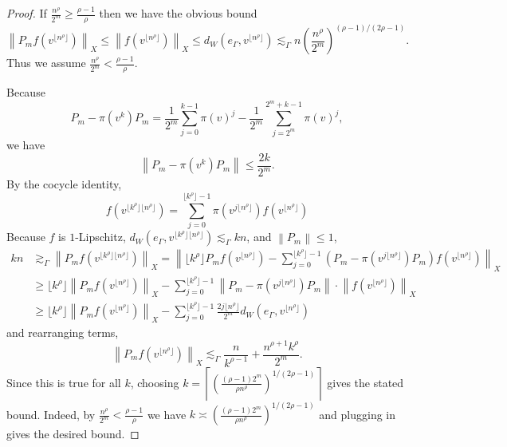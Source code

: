 \documentclass[11pt,reqno]{amsart}
\newcommand{\1}{\mathbf 1}
\begin{document}
\begin{proof}
If $\frac{n^\rho}{2^m}\ge \frac{\rho-1}\rho$ then we have the obvious bound
\[
\left\|P_m f\left(v^{\lfloor n^\rho\rfloor}\right)\right\|_X\le \left\| f\left(v^{\lfloor n^\rho\rfloor}\right)\right\|_X\le d_W\left(e_\Gamma,v^{\lfloor n^\rho\rfloor}\right)\lesssim_\Gamma n\left(\frac{n^\rho}{2^m}\right)^{\left(\rho-1\right)/\left(2\rho-1\right)}.
\]
Thus we assume $\frac{n^\rho}{2^m}< \frac{\rho-1}\rho$.

Because
\[
P_m-\pi\left(v^k\right)P_m= \frac{1}{2^m}\sum_{j=0}^{k-1}\pi\left(v\right)^j-\frac{1}{2^m}\sum_{j=2^m}^{2^m+k-1}\pi\left(v\right)^j,
\]
we have
\[
\left\|P_m-\pi\left(v^k\right)P_m\right\|\le \frac{2k}{2^m}.
\]
By the cocycle identity,
\[
f\left(v^{\lfloor k^\rho\rfloor \lfloor n^\rho\rfloor}\right)=\sum_{j=0}^{\lfloor k^\rho\rfloor -1} \pi\left(v^{j\lfloor n^\rho\rfloor }\right)f\left(v^{\lfloor n^\rho\rfloor}\right)
\]
Because $f$ is $1$-Lipschitz, $d_W\left(e_\Gamma,v^{\lfloor k^\rho\rfloor \lfloor n^\rho\rfloor}\right)\lesssim_\Gamma kn$, and $\left\|P_m\right\|\le 1$,
\begin{align*}
kn&\gtrsim_\Gamma \left\|P_mf \left(v^{\lfloor k^\rho\rfloor \lfloor n^\rho\rfloor}\right)\right\|_X=\left\|\lfloor k^\rho\rfloor P_mf\left(v^{\lfloor n^\rho\rfloor}\right) -\sum_{j=0}^{\lfloor k^\rho\rfloor -1} \left(P_m-\pi\left(v^{j\lfloor n^\rho\rfloor }\right)P_m\right)f\left(v^{\lfloor n^\rho\rfloor}\right)\right\|_X\\
&\ge \lfloor k^\rho\rfloor\left\| P_mf\left(v^{\lfloor n^\rho\rfloor}\right)\right\|_X -\sum_{j=0}^{\lfloor k^\rho\rfloor -1} \left\|P_m-\pi\left(v^{j\lfloor n^\rho\rfloor }\right)P_m\right\|\cdot\left\|f\left(v^{\lfloor n^\rho\rfloor}\right)\right\|_X\\
&\ge \lfloor k^\rho\rfloor\left\| P_mf\left(v^{\lfloor n^\rho\rfloor}\right)\right\|_X -\sum_{j=0}^{\lfloor k^\rho\rfloor -1}\frac{2j\lfloor n^\rho\rfloor}{2^m}d_W\left(e_\Gamma,v^{\lfloor n^\rho\rfloor}\right)
\end{align*}
and rearranging terms,
\[
\left\| P_mf\left(v^{\lfloor n^\rho\rfloor}\right)\right\|_X\lesssim_\Gamma \frac{n}{k^{\rho-1}}+\frac{n^{\rho+1}k^\rho}{2^m}.
\]
Since this is true for all $k$, choosing $k=\left\lceil \left(\frac{\left(\rho-1\right)2^m}{\rho n^\rho}\right)^{1/\left(2\rho-1\right)}\right\rceil$ gives the stated bound. Indeed, by $\frac{n^\rho}{2^m}< \frac{\rho-1}\rho$ we have $k\asymp \left(\frac{\left(\rho-1\right)2^m}{\rho n^\rho}\right)^{1/\left(2\rho-1\right)}$ and plugging in gives the desired bound.
\end{proof}
\end{document}
